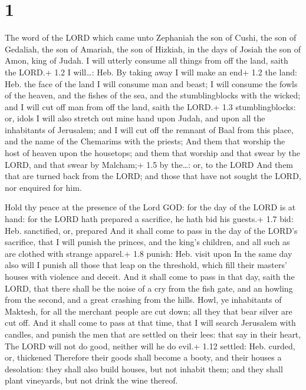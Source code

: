 \hypertarget{section}{%
\section{1}\label{section}}

 The word of the LORD which came unto Zephaniah the son of
Cushi, the son of Gedaliah, the son of Amariah, the son of Hizkiah, in
the days of Josiah the son of Amon, king of Judah.  I will
utterly consume all things from off the land, saith the LORD.+ 1.2 I
will\ldots: Heb. By taking away I will make an end+ 1.2 the land: Heb.
the face of the land  I will consume man and beast; I will
consume the fowls of the heaven, and the fishes of the sea, and the
stumblingblocks with the wicked; and I will cut off man from off the
land, saith the LORD.+ 1.3 stumblingblocks: or, idols  I
will also stretch out mine hand upon Judah, and upon all the inhabitants
of Jerusalem; and I will cut off the remnant of Baal from this place,
and the name of the Chemarims with the priests;  And them
that worship the host of heaven upon the housetops; and them that
worship and that swear by the LORD, and that swear by Malcham;+ 1.5 by
the\ldots: or, to the LORD  And them that are turned back
from the LORD; and those that have not sought the LORD, nor enquired for
him.

 Hold thy peace at the presence of the Lord GOD: for the day
of the LORD is at hand: for the LORD hath prepared a sacrifice, he hath
bid his guests.+ 1.7 bid: Heb. sanctified, or, prepared  And
it shall come to pass in the day of the LORD's sacrifice, that I will
punish the princes, and the king's children, and all such as are clothed
with strange apparel.+ 1.8 punish: Heb. visit upon  In the
same day also will I punish all those that leap on the threshold, which
fill their masters' houses with violence and deceit.  And
it shall come to pass in that day, saith the LORD, that there shall be
the noise of a cry from the fish gate, and an howling from the second,
and a great crashing from the hills.  Howl, ye inhabitants
of Maktesh, for all the merchant people are cut down; all they that bear
silver are cut off.  And it shall come to pass at that
time, that I will search Jerusalem with candles, and punish the men that
are settled on their lees: that say in their heart, The LORD will not do
good, neither will he do evil.+ 1.12 settled: Heb. curded, or, thickened
 Therefore their goods shall become a booty, and their
houses a desolation: they shall also build houses, but not inhabit them;
and they shall plant vineyards, but not drink the wine thereof.

